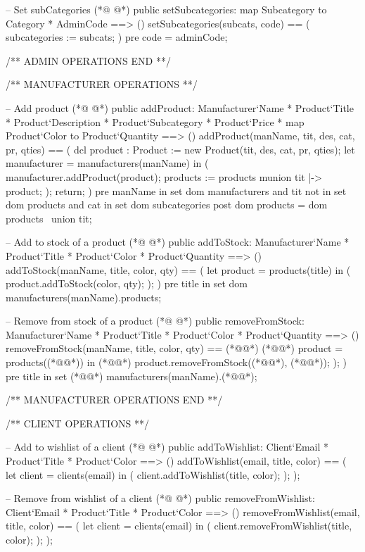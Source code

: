 \begin{vdmpp}[breaklines=true]
 -- Set subCategories
(*@
\label{setSubcategories:75}
@*)
 public setSubcategories: map Subcategory to Category * AdminCode ==> ()
 setSubcategories(subcats, code) == (
  subcategories := subcats;
 )
 pre code = adminCode;
 
 /** ADMIN OPERATIONS END **/
 
 
 /** MANUFACTURER OPERATIONS **/
 
 -- Add product
(*@
\label{addProduct:87}
@*)
 public addProduct: Manufacturer`Name * Product`Title * Product`Description * Product`Subcategory * Product`Price * map Product`Color to Product`Quantity ==> ()
 addProduct(manName, tit, des, cat, pr, qties) == (
  dcl product : Product := new Product(tit, des, cat, pr, qties);
  let manufacturer = manufacturers(manName)
   in (
    manufacturer.addProduct(product);
    products := products munion {tit |-> product};
   );
   return;
 )
 pre manName in set dom manufacturers
  and tit not in set dom products
  and cat in set dom subcategories
 post dom products = dom products~ union {tit};
 
 -- Add to stock of a product
(*@
\label{addToStock:103}
@*)
 public addToStock: Manufacturer`Name * Product`Title * Product`Color * Product`Quantity ==> ()
 addToStock(manName, title, color, qty) == (
  let product = products(title)
  in (
   product.addToStock(color, qty);
  );
 )
 pre title in set dom manufacturers(manName).products;
 
 -- Remove from stock of a product
(*@
\label{removeFromStock:113}
@*)
 public removeFromStock: Manufacturer`Name * Product`Title * Product`Color * Product`Quantity ==> ()
 removeFromStock(manName, title, color, qty) == (*@\vdmnotcovered{(}@*)
  (*@@*) product = products((*@@*))
  in (*@\vdmnotcovered{(}@*)
   product.removeFromStock((*@@*), (*@@*));
  );
 )
 pre title in set (*@@*) manufacturers(manName).(*@@*);
 
 /** MANUFACTURER OPERATIONS END **/


 /** CLIENT OPERATIONS **/
 
 -- Add to wishlist of a client
(*@
\label{addToWishlist:128}
@*)
 public addToWishlist: Client`Email * Product`Title * Product`Color ==> ()
 addToWishlist(email, title, color) == (
  let client = clients(email)
  in (
   client.addToWishlist(title, color);
  );
 );
 
 -- Remove from wishlist of a client
(*@
\label{removeFromWishlist:137}
@*)
 public removeFromWishlist: Client`Email * Product`Title * Product`Color ==> ()
 removeFromWishlist(email, title, color) == (
  let client = clients(email)
  in (
   client.removeFromWishlist(title, color);
  );
 );
 

\end{vdmpp}
